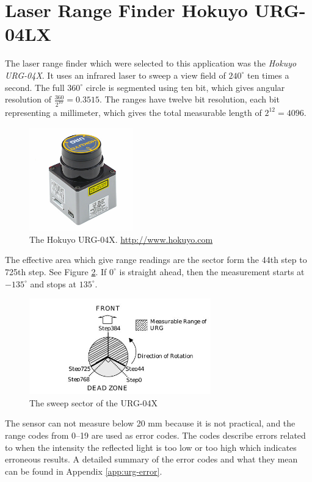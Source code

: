 \section{Laser Range Finder Hokuyo URG-04LX}
\label{chap3:sec-urg}
The laser range finder which were selected to this application was the \emph{Hokuyo
URG-04X}. It uses an infrared laser to sweep a view field of $240^\circ$ ten times a
second. The full $360^\circ$ circle is segmented using ten bit, which gives angular
resolution of $\frac{360}{2^{10}} = 0.3515$. The ranges have twelve bit resolution, each
bit representing a millimeter, which gives the total measurable length of $2^{12} = 4096$.
\begin{figure}[htbp]
    \centering
    \includegraphics[width=0.4\textwidth]{pics/urg04lx}
    \caption{The Hokuyo URG-04X. \url{http://www.hokuyo.com}}
    \label{chap3:fig-urg}
\end{figure}
The effective area which give range readings are the sector form the 44th step to
725th step. See Figure \ref{chap3:fig-urg-sector}. If $0^\circ$ is straight ahead, then
the measurement starts at $-135^\circ$ and stops at $135^\circ$. 
\begin{figure}[htbp]
    \centering
    \includegraphics[width=0.7\textwidth]{pics/urg-sector}
    \caption{The sweep sector of the URG-04X}
    \label{chap3:fig-urg-sector}
\end{figure}

The sensor can not measure below 20 mm because it is not practical, and the range codes
from 0--19 are used as error codes. The codes describe errors related to when the intensity 
the reflected light
is too low or too high which indicates erroneous results. A detailed summary of the
error codes and what they mean can be found in Appendix \ref{app:urg-error}.


